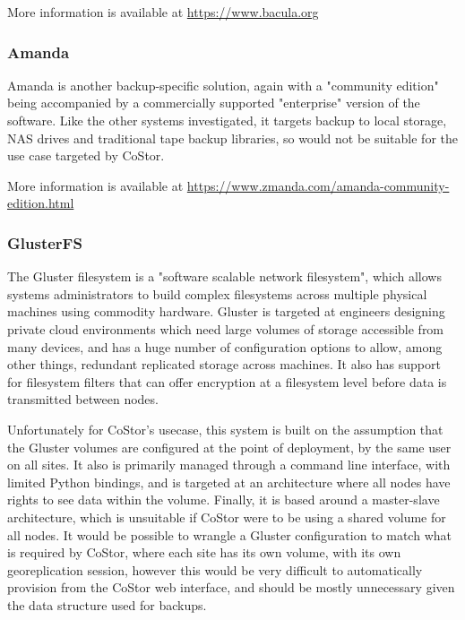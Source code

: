 \documentclass[bsc,frontabs,twoside,singlespacing,parskip,deptreport]{infthesis}     %
\begin{document}
More information is available at \url{https://www.bacula.org} \cite{bacula}

\subsubsection{Amanda}

Amanda is another backup-specific solution, again with a "community edition" being accompanied
by a commercially supported "enterprise" version of the software. Like the other systems 
investigated, it targets backup to local storage, NAS drives and traditional tape backup
libraries, so would not be suitable for the use case targeted by CoStor.

More information is available at \url{https://www.zmanda.com/amanda-community-edition.html} \cite{zmanda}

\subsubsection{GlusterFS}

The Gluster filesystem is a "software scalable network filesystem"\cite{gluster-home}, which 
allows systems administrators to build complex filesystems across multiple physical machines
using commodity hardware. Gluster is targeted at engineers designing private cloud environments
which need large volumes of storage accessible from many devices, and has a huge number of 
configuration options to allow, among other things, redundant replicated storage across machines.
It also has support for filesystem filters that can offer encryption at a filesystem level before
data is transmitted between nodes.

Unfortunately for CoStor's usecase, this system is built on the assumption that the Gluster 
volumes are configured at the point of deployment, by the same user on all sites. It also is
primarily managed through a command line interface, with limited Python bindings, and is targeted
at an architecture where all nodes have rights to see data within the volume. Finally, it is
based around a master-slave architecture, which is unsuitable if CoStor were to be using a shared
volume for all nodes. It would be possible to wrangle a Gluster configuration to match what is
required by CoStor, where each site has its own volume, with its own georeplication session, 
however this would be very difficult to automatically provision from the CoStor web interface, 
and should be mostly unnecessary given the data structure used for backups.
\end{document}
